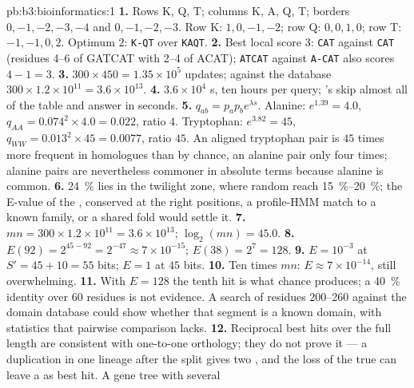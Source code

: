 \begin{solution}{pb:b3:bioinformatics:1}
\textbf{1.} Rows K, Q, T; columns K, A, Q, T; borders $0,-1,-2,-3,-4$
and $0,-1,-2,-3$. Row K: $1, 0, -1, -2$; row Q: $0, 0, 1, 0$; row T:
$-1, -1, 0, 2$. Optimum $2$: \texttt{K-QT} over \texttt{KAQT}.
\textbf{2.} Best local score $3$: \texttt{CAT} against \texttt{CAT}
(residues 4--6 of GATCAT with 2--4 of ACAT); \texttt{ATCAT} against
\texttt{A-CAT} also scores $4 - 1 = 3$.
\textbf{3.} $300\times 450 = 1.35\times 10^{5}$ updates; against the
database $300\times 1.2\times 10^{11} = 3.6\times 10^{13}$.
\textbf{4.} $3.6\times 10^{4}$ s, ten hours per query; 's 
skip almost all of the table and answer in seconds.
\textbf{5.} $q_{ab} = p_{a}p_{b}e^{\lambda s}$. Alanine: $e^{1.39} = 4.0$,
$q_{AA} = 0.074^{2}\times 4.0 = 0.022$, ratio $4$. Tryptophan:
$e^{3.82} = 45$, $q_{WW} = 0.013^{2}\times 45 = 0.0077$, ratio $45$. An
aligned tryptophan pair is $45$ times more frequent in homologues than
by chance, an alanine pair only four times; alanine pairs are
nevertheless commoner in absolute terms because alanine is common.
\textbf{6.} \qty{24}{\%} lies in the twilight zone, where random
 reach \qtyrange{15}{20}{\%}; the E-value of the ,
conserved  at the right positions, a profile-HMM match to a known
family, or a shared fold would settle it.
\textbf{7.} $mn = 300\times 1.2\times 10^{11} = 3.6\times 10^{13}$;
$\log_{2}(mn) = 45.0$.
\textbf{8.} $E(92) = 2^{45 - 92} = 2^{-47} \approx 7\times 10^{-15}$;
$E(38) = 2^{7} = 128$.
\textbf{9.} $E = 10^{-3}$ at $S' = 45 + 10 = 55$ bits; $E = 1$ at $45$
bits.
\textbf{10.} Ten times $mn$: $E \approx 7\times 10^{-14}$, still
overwhelming.
\textbf{11.} With $E = 128$ the tenth hit is what chance produces; a
\qty{40}{\%} identity over $60$ residues is not evidence. A  search
of residues 200--260 against the domain database could show whether
that segment is a known domain, with statistics that pairwise
comparison lacks.
\textbf{12.} Reciprocal best hits over the full length are consistent
with one-to-one orthology; they do not prove it --- a duplication in
one lineage after the split gives two , and the loss of the
true  can leave a  as best hit. A gene tree with several

\end{solution}
